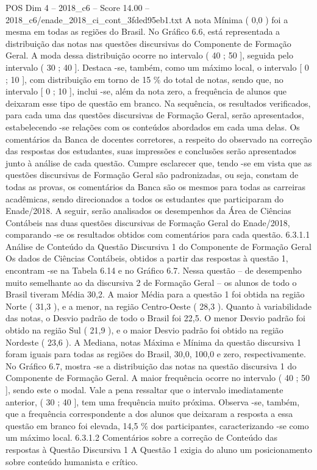 \begin{textsample}{POS Dim 4 – 2018\_c6 – Score 14.00 – 2018\_c6/enade\_2018\_ci\_cont\_3fded95eb1.txt}
A nota Mínima ( 0,0 ) foi a mesma em todas as regiões do Brasil.
No Gráfico 6.6, está representada a distribuição das notas nas questões discursivas do Componente de Formação Geral.
A moda dessa distribuição ocorre no intervalo ( 40 ; 50 ], seguida pelo intervalo ( 30 ; 40 ].
Destaca -se, também, como um máximo local, o intervalo [ 0 ; 10 ], com distribuição em torno de 15 \% do total de notas, sendo que, no intervalo [ 0 ; 10 ], inclui -se, além da nota zero, a frequência de alunos que deixaram esse tipo de questão em branco.
Na sequência, os resultados verificados, para cada uma das questões discursivas de Formação Geral, serão apresentados, estabelecendo -se relações com os conteúdos abordados em cada uma delas.
Os comentários da Banca de docentes corretores, a respeito do observado na correção das respostas dos estudantes, suas impressões e conclusões serão apresentados junto à análise de cada questão.
Cumpre esclarecer que, tendo -se em vista que as questões discursivas de Formação Geral são padronizadas, ou seja, constam de todas as provas, os comentários da Banca são os mesmos para todas as carreiras acadêmicas, sendo direcionados a todos os estudantes que participaram do Enade/2018.
A seguir, serão analisados os desempenhos da Área de Ciências Contábeis nas duas questões discursivas de Formação Geral do Enade/2018, comparando -se os resultados obtidos com comentários para cada questão. 6.3.1.1 Análise de Conteúdo da Questão Discursiva 1 do Componente de Formação Geral Os dados de Ciências Contábeis, obtidos a partir das respostas à questão 1, encontram -se na Tabela 6.14 e no Gráfico 6.7.
Nessa questão – de desempenho muito semelhante ao da discursiva 2 de Formação Geral – os alunos de todo o Brasil tiveram Média 30,2.
A maior Média para a questão 1 foi obtida na região Norte ( 31,3 ), e a menor, na região Centro-Oeste ( 28,3 ).
Quanto à variabilidade das notas, o Desvio padrão de todo o Brasil foi 22,5.
O menor Desvio padrão foi obtido na região Sul ( 21,9 ), e o maior Desvio padrão foi obtido na região Nordeste ( 23,6 ).
A Mediana, notas Máxima e Mínima da questão discursiva 1 foram iguais para todas as regiões do Brasil, 30,0, 100,0 e zero, respectivamente.
No Gráfico 6.7, mostra -se a distribuição das notas na questão discursiva 1 do Componente de Formação Geral.
A maior frequência ocorre no intervalo ( 40 ; 50 ], sendo este o modal.
Vale a pena ressaltar que o intervalo imediatamente anterior, ( 30 ; 40 ], tem uma frequência muito próxima.
Observa -se, também, que a frequência correspondente a dos alunos que deixaram a resposta a essa questão em branco foi elevada, 14,5 \% dos participantes, caracterizando -se como um máximo local. 6.3.1.2 Comentários sobre a correção de Conteúdo das respostas à Questão Discursiva 1 A Questão 1 exigia do aluno um posicionamento sobre conteúdo humanista e crítico.

\end{textsample}
